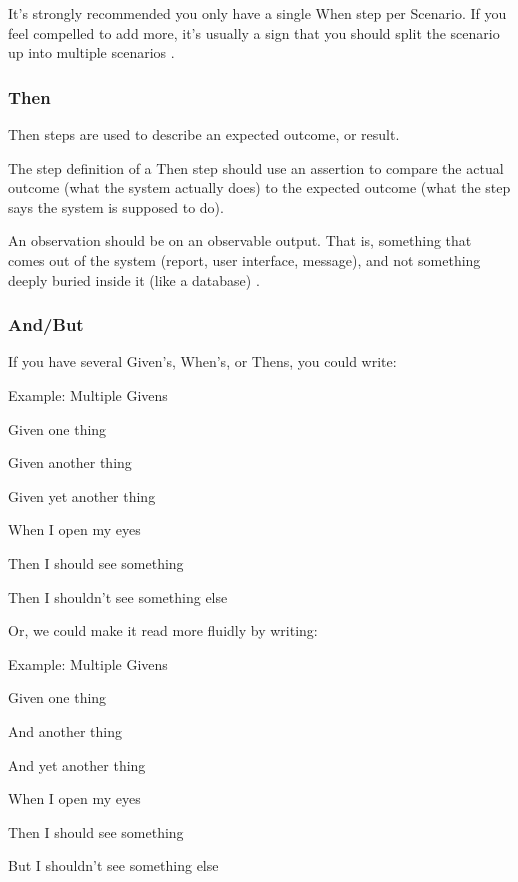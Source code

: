 \documentclass[conference, onecolumn, a4, 12pt]{IEEEtran}
\begin{document}
It’s strongly recommended you only have a single When step per Scenario. If you feel compelled to add more, it’s usually a sign that you should split the scenario up into multiple scenarios \cite{a1}.

\subsubsection{Then}
Then steps are used to describe an expected outcome, or result.

The step definition of a Then step should use an assertion to compare the actual outcome (what the system actually does) to the expected outcome (what the step says the system is supposed to do).

An observation should be on an observable output. That is, something that comes out of the system (report, user interface, message), and not something deeply buried inside it (like a database) \cite{a1}.

\subsubsection{And/But}
If you have several Given’s, When’s, or Thens, you could write: \cite{a1}

\begin{list}{*}{spacing}
	\item Example: Multiple Givens
	\item Given one thing
	\item Given another thing
	\item Given yet another thing
	\item When I open my eyes
	\item Then I should see something
	\item Then I shouldn't see something else
\end{list}

Or, we could make it read more fluidly by writing:  \cite{a1}
\begin{list}{*}{spacing}
	\item Example: Multiple Givens
	\item Given one thing
	\item And another thing
	\item And yet another thing
	\item When I open my eyes
	\item Then I should see something
	\item But I shouldn't see something else
\end{list}
\end{document}
